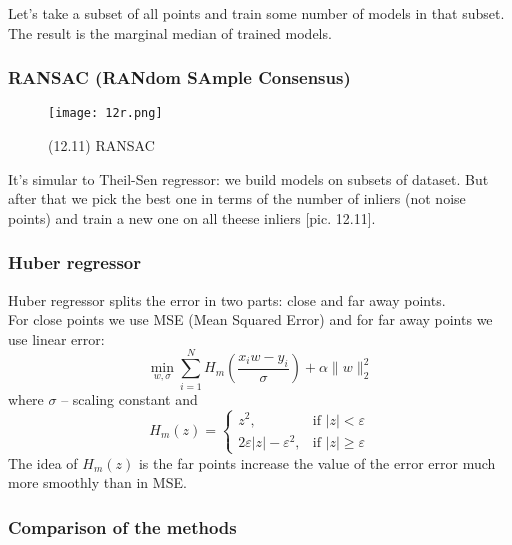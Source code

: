 Let's take a subset of all points and train some number of models in that subset. The result is the marginal median of trained models.

\newpage
\subsubsection*{RANSAC (RANdom SAmple Consensus)}

\begin{wrapfigure}{r}{0.26\linewidth}
	\vspace{-2cm}
  \begin{center}
    \texttt{[image: 12r.png]}
  \end{center}
  \vspace{-0.6cm}
  \caption*{(12.11) RANSAC}
  \vspace{-1cm}
\end{wrapfigure}
It's simular to Theil-Sen regressor: we build models on subsets of dataset. But after that we pick the best one in terms of the number of inliers (not noise points) and train a new one on all theese inliers [pic. 12.11].

\subsubsection*{Huber regressor} 

Huber regressor splits the error in two parts: close and far away points. \\
For close points we use MSE (Mean Squared Error) and for far away points we use linear error:
$$\min\limits_{w,\sigma}\sum\limits_{i=1}^{N}H_{m}\left(\frac{x_iw-y_i}{\sigma}\right)+\alpha\|w\|_2^2$$
where $\sigma$ -- scaling constant and 
$$H_m(z)=\begin{cases}
	z^2, & \text{if } |z|<\varepsilon \\
	2\varepsilon|z|-\varepsilon^2, & \text{if } |z|\ge\varepsilon
\end{cases}$$
The idea of $H_m(z)$ is the far points increase the value of the error error much more smoothly than in MSE.

\subsubsection*{Comparison of the methods}

